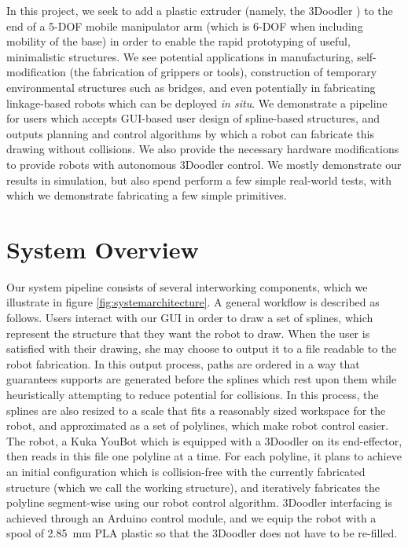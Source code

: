 \documentclass[conference]{acmsiggraph}
\begin{document}
In this project, we seek to add a plastic extruder (namely, the 3Doodler \cite{3doodler}) to the end of a 5-DOF mobile manipulator arm (which is 6-DOF when including mobility of the base) in order to enable the rapid prototyping of useful, minimalistic structures.  We see potential applications in manufacturing, self-modification (the fabrication of grippers or tools), construction of temporary environmental structures such as bridges, and even potentially in fabricating linkage-based robots which can be deployed \emph{in situ}.  We demonstrate a pipeline for users which accepts GUI-based user design of spline-based structures, and outputs planning and control algorithms by which a robot can fabricate this drawing without collisions.  We also provide the necessary hardware modifications to provide robots with autonomous 3Doodler control.  We mostly demonstrate our results in simulation, but also spend perform a few simple real-world tests, with which we demonstrate fabricating a few simple primitives.

\section{System Overview}
Our system pipeline consists of several interworking components, which we illustrate in figure \ref{fig:systemarchitecture}.  A general workflow is described as follows.  Users interact with our GUI in order to draw a set of splines, which represent the structure that they want the robot to draw.  When the user is satisfied with their drawing, she may choose to output it to a file readable to the robot fabrication.  In this output process, paths are ordered in a way that guarantees supports are generated before the splines which rest upon them while heuristically attempting to reduce potential for collisions.  In this process, the splines are also resized to a scale that fits a reasonably sized workspace for the robot, and approximated as a set of polylines, which make robot control easier.  The robot, a Kuka YouBot \cite{YouBot} which is equipped with a 3Doodler on its end-effector, then reads in this file one polyline at a time.  For each polyline, it plans to achieve an initial configuration which is collision-free with the currently fabricated structure (which we call the working structure), and iteratively fabricates the polyline segment-wise using our robot control algorithm.  3Doodler interfacing is achieved through an Arduino control module, and we equip the robot with a spool of 2.85~mm PLA plastic so that the 3Doodler does not have to be re-filled.
\end{document}
